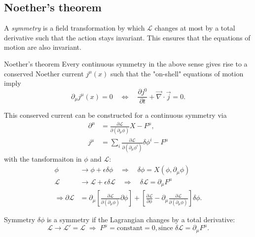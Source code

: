 \subsection{Noether's theorem}
A \emph{symmetry} is a field transformation by which $\mathcal{L}$ changes at most by a total derivative such that the action stays invariant. This ensures that the equations of motion are also invariant.\\
\begin{mybox}{Noether's theorem}
	Every continuous symmetry in the above sense gives rise to a conserved Noether current $j^{\mu}(x)$ such that the "on-shell" equations of motion imply
	\begin{equation}
		\partial_{\mu} j^{\mu}(x) = 0 \quad \Leftrightarrow \quad \frac{\partial j^0}{\partial t} + \vec{\nabla}\cdot \vec{j} = 0.
	\end{equation}
\end{mybox}
	This conserved current can be constructed for a continuous symmetry via
	\begin{align}
		\partial^{\mu} &= \frac{\partial \mathcal{L}}{\partial(\partial_{\mu}\phi)} X - F^{\mu}, \\
		j^{\mu} &= \sum_i  \frac{\partial \mathcal{L}}{\partial(\partial_{\mu} \phi^i)} \delta \phi^i - F^{\mu}
	\end{align}
with the tansformaiton in $\phi$ and $\mathcal{L}$:
\begin{align}
	\phi &\rightarrow \phi + \epsilon \delta \phi \quad \Rightarrow \quad \delta \phi =X(\phi,\partial_{\mu}\phi) \\
	\mathcal{L} & \rightarrow \mathcal{L}+\epsilon \delta \mathcal{L} \quad \Rightarrow \quad \delta \mathcal{L}=\partial_{\mu}F^{\mu}\\
	\Rightarrow \partial \mathcal{L} &= \partial_{\mu} \left[\frac{\partial \mathcal{L}}{\partial(\partial_{\mu}\phi)} \partial \phi \right] + \left[\frac{\partial \mathcal{L}}{\partial \phi} - \partial_{\mu} \frac{\partial \mathcal{L}}{\partial(\partial_{\mu}\phi)}\right] \delta \phi.
\end{align}
\begin{mybox}{Symmetry}
 $\delta \phi$ is a symmetry if the Lagrangian changes by a total derivative:
 \begin{equation}
 	\mathcal{L} \rightarrow \mathcal{L}'=\mathcal{L} \; \Rightarrow \; F^{\mu} = \mathrm{constant} =0, \mathrm{since} \;\delta\mathcal{L}=\partial_{\mu}F^{\mu}.
 \end{equation}
\end{mybox}
